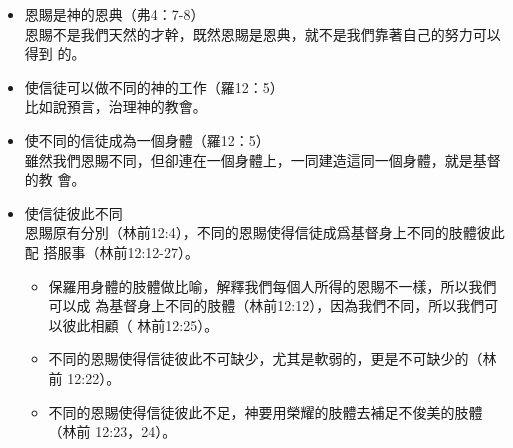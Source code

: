 \begin{itemize}
\item 恩賜是神的恩典（弗4：7-8）\\ 
恩賜不是我們天然的才幹，既然恩賜是恩典，就不是我們靠著自己的努力可以得到
的。
\item 使信徒可以做不同的神的工作（羅12：5）\\ 
比如說預言，治理神的教會。
\item 使不同的信徒成為一個身體（羅12：5）\\ 
雖然我們恩賜不同，但卻連在一個身體上，一同建造這同一個身體，就是基督的教
會。
\item 使信徒彼此不同\\ 
恩賜原有分別（林前12:4），不同的恩賜使得信徒成爲基督身上不同的肢體彼此配
搭服事（林前12:12-27）。
\begin{itemize}
\item 保羅用身體的肢體做比喻，解釋我們每個人所得的恩賜不一樣，所以我們可以成
為基督身上不同的肢體（林前12:12），因為我們不同，所以我們可以彼此相顧（
林前12:25）。
\item 不同的恩賜使得信徒彼此不可缺少，尤其是軟弱的，更是不可缺少的（林前
12:22）。
\item 不同的恩賜使得信徒彼此不足，神要用榮耀的肢體去補足不俊美的肢體（林前
12:23，24）。
\end{itemize}
\end{itemize}

